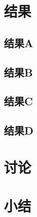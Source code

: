 \section{结果}
\subsection{结果A}
\Blindtext

\subsection{结果B}
\Blindtext

\subsection{结果C}
\Blindtext

\subsection{结果D}
\Blindtext

\section{讨论}
\Blindtext

\section{小结}
\Blindtext 